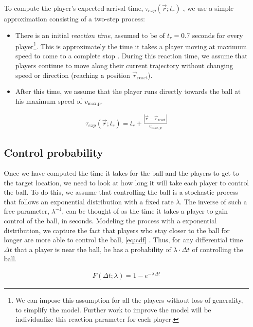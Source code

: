 \documentclass[
  10pt,
  twoside,nohyper]{book}
\providecommand{\tightlist}{%
  \setlength{\itemsep}{0pt}\setlength{\parskip}{0pt}}
\begin{document}
To compute the player's expected arrival time, \(\tau_{exp}(\vec{r};t_r)\) , we use a simple approximation consisting of a two-step process:

\begin{itemize}
\tightlist
\item
  There is an initial \emph{reaction time}, assumed to be of \(t_{r} = 0.7\) seconds for every player\footnote{We can impose this assumption for all the players without loss of generality, to simplify the model. Further work to improve the model will be individualize this reaction parameter for each player.}. This is approximately the time it takes a player moving at maximum speed to come to a complete stop \autocite{Spearman}. During this reaction time, we assume that players continue to move along their current trajectory without changing speed or direction (reaching a position \(\vec{r}_{\text{react}}\)).
\item
  After this time, we assume that the player runs directly towards the ball at his maximum speed of \(v_{\text{max,p}}\).
\end{itemize}

\begin{align*}
    \tau_{exp}(\vec{r} ; t_r) = t_r + \frac{|\vec{r} - \vec{r}_{react}|}{v_{max,p}}
\end{align*}

\subsection{Control probability}\label{control-probability}

Once we have computed the time it takes for the ball and the players to get to the target location, we need to look at how long it will take each player to control the ball. To do this, we assume that controlling the ball is a stochastic process that follows an exponential distribution with a fixed rate \(\lambda\). The inverse of such a free parameter, \(\lambda^{-1}\), can be thought of as the time it takes a player to gain control of the ball, in seconds. Modeling the process with a exponential distribution, we capture the fact that players who stay closer to the ball for longer are more able to control the ball, \eqref{eq:cdf} \autocite{SpearmanFit}. Thus, for any differential time \(\Delta t\) that a player is near the ball, he has a probability of \(\lambda \cdot \Delta t\) of controlling the ball.

\begin{align}
F(\Delta t ; \lambda)=1-e^{-\lambda \Delta t}
\label{eq:cdf}
\end{align}
\end{document}
